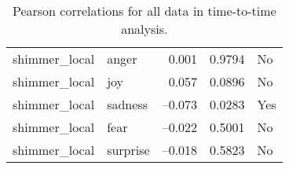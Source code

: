 \begin{table}[ht]
\begin{tabular}{l l r r l}
      \addlinespace
      shimmer\_local        & anger    &  0.001      & 0.9794    & No  \\
      shimmer\_local        & joy      &  0.057      & 0.0896    & No  \\
      shimmer\_local        & sadness  & –0.073      & 0.0283    & Yes \\
      shimmer\_local        & fear     & –0.022      & 0.5001    & No  \\
      shimmer\_local        & surprise & –0.018      & 0.5823    & No  \\
      \bottomrule
    \end{tabular}
    \caption{Pearson correlations for all data in time-to-time analysis.}
    \label{tab:pearson_all}
  \end{table}
  
  \begin{table}[ht]
    \centering
    

\end{table}
